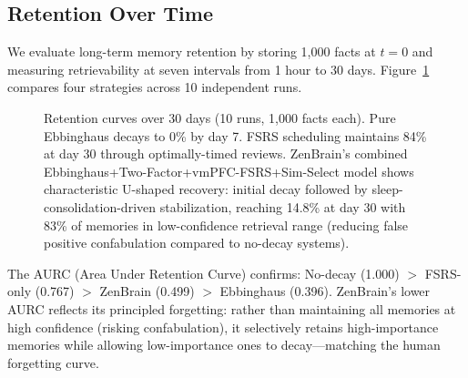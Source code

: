 \documentclass{article}
\begin{document}
\subsection{Retention Over Time}
\label{app:retention}

We evaluate long-term memory retention by storing 1{,}000 facts at $t=0$
and measuring retrievability at seven intervals from 1 hour to 30 days.
Figure~\ref{fig:retention} compares four strategies across 10 independent runs.

\begin{figure}[h]
    \centering
    \caption{Retention curves over 30 days (10 runs, 1{,}000 facts each).
    Pure Ebbinghaus decays to 0\% by day 7.
    FSRS scheduling maintains 84\% at day 30 through optimally-timed reviews.
    ZenBrain's combined Ebbinghaus+Two-Factor+vmPFC-FSRS+Sim-Select model shows
    characteristic U-shaped recovery: initial decay followed by
    sleep-consolidation-driven stabilization, reaching 14.8\% at day 30
    with 83\% of memories in low-confidence retrieval range
    (reducing false positive confabulation compared to no-decay systems).}
    \label{fig:retention}
\end{figure}

The AURC (Area Under Retention Curve) confirms: No-decay (1.000) $>$ FSRS-only (0.767) $>$
ZenBrain (0.499) $>$ Ebbinghaus (0.396).
ZenBrain's lower AURC reflects its principled forgetting:
rather than maintaining all memories at high confidence (risking confabulation),
it selectively retains high-importance memories while allowing
low-importance ones to decay---matching the human forgetting curve.
\end{document}
